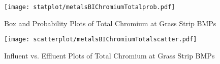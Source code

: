         \begin{figure}[hb]   %
            \centering
            \texttt{[image: statplot/metalsBIChromiumTotalprob.pdf]}
            \caption{Box and Probability Plots of Total Chromium at Grass Strip BMPs}
        \end{figure}         %
        
        
        \begin{figure}[hb]   %
            \centering
            \texttt{[image: scatterplot/metalsBIChromiumTotalscatter.pdf]}
            \caption{Influent vs. Effluent Plots of Total Chromium at Grass Strip BMPs}
        \end{figure}         %
        \clearpage
        
